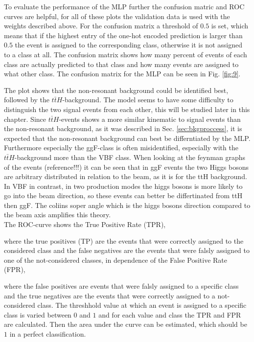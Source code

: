 To evaluate the performance of the MLP further the confusion matric and ROC curves are helpful, for all of these plots the validation data is used with the weights described above.
For the confusion matrix a threshold of $0.5$ is set, which means that if the highest entry
of the one-hot encoded prediction is larger than $0.5$ the event is assigned to the corresponding class, otherwise it is not assigned to a class at all. The confusion matrix shows
how many percent of events of each class are actually predicted to that class and how many events are assigned to what other class. The confusion matrix for the MLP can be seen in Fig. \ref{fig:9}.


The plot shows that the non-resonant background could be identified best, followed by the $t \bar{t} H$-background. The model seems to have some difficulty to distinguish
the two signal events from each other, this will be studied later in this chapter. Since $t \bar{t} H$-events shows a more similar kinematic to signal events than the non-resonant background, as it was described in Sec. \ref{sec:bkgproccess}, it is expected
that the non-resonant background can best be differntiated by the MLP. Furthermore especially the ggF-class is often misidentified, especially with the $t \bar{t}H$-background more than the VBF class.
When looking at the feynman graphs of the events (reference!!!) it can be seen that in ggF events the two Higgs bosons are arbitrary distributed in relation to the beam, as it is for the ttH background.
In VBF in contrast, in two production modes the higgs bosons is more likely to go into the beam direction, so these events can better be differtinated from ttH then ggF.
The coliins soper angle which is the higgs bosons direction compared to the beam axis amplifies this theory. \\ 

The ROC-curve shows the True Positive Rate (TPR),


where the true positives (TP) are the events that were correctly assigned to the considered class and the false negatives are the events that were falsly assigned to one of the not-considered classes,
in dependence of the False Positive Rate (FPR),


where the false positives are events that were falsly assigned to a specific class and the true negatives are the events that were correctly assigned to a not-considered class.
The threshhold value at which an event is assigned to a specific class is varied between $0$ and $1$ and for each value and class the TPR and FPR are calculated. Then the area under the curve can be estimated,
which should be $1$ in a perfect classification. 

